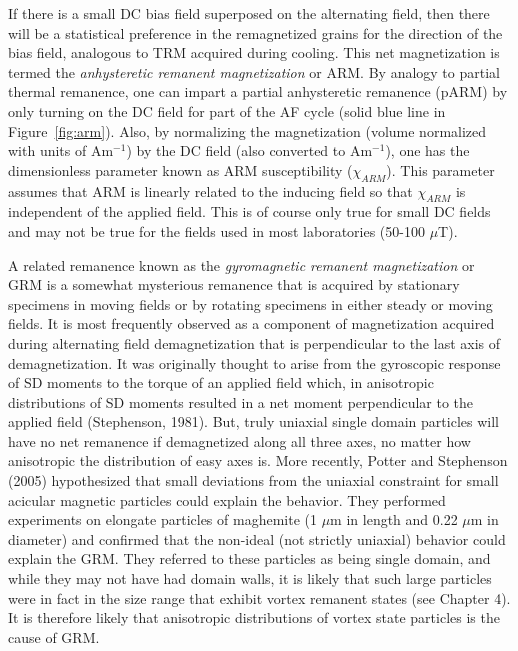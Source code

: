 If there is a small DC bias field superposed on the alternating field, then there will be a statistical
preference in the remagnetized grains for the direction of the bias field,   analogous to
TRM acquired during cooling.  This net magnetization is termed the {\it anhysteretic remanent magnetization} or ARM. 
 By analogy to partial thermal remanence, one can impart a partial anhysteretic remanence (pARM) by only turning on the DC field for part of the AF cycle (solid blue line in Figure~\ref{fig:arm}).    Also, by normalizing the magnetization (volume normalized with units of Am$^{-1}$) by the DC field (also converted to Am$^{-1}$), one has the dimensionless parameter known as ARM susceptibility ($\chi_{ARM}$).   This parameter assumes that ARM is linearly related to the inducing field so that $\chi_{ARM}$ is independent of the applied field.  This is of course only true for small DC fields and may not be true for the fields used in most laboratories (50-100 $\mu$T).    


A related remanence known as the
 {\it gyromagnetic remanent magnetization} or  GRM is a somewhat mysterious remanence that is acquired by stationary specimens in moving fields or by rotating specimens in either steady or moving fields.    It is most frequently observed as a component of magnetization acquired during alternating field demagnetization that is perpendicular to the last axis of demagnetization.   
  It was originally thought to arise from the gyroscopic response of SD moments to the torque of an applied field which, in anisotropic distributions of SD moments resulted in a net moment perpendicular to the applied field
 (Stephenson, 1981). \nocite{stephenson81}  But, truly uniaxial single domain particles will have no net remanence if demagnetized along all three axes, no matter how anisotropic the distribution of easy axes is.  More recently, 
 Potter and Stephenson (2005) \nocite{potter05} hypothesized that small deviations from the uniaxial constraint for small acicular magnetic particles could explain the behavior.  They  performed experiments on elongate particles of maghemite (1 $\mu$m in length and 0.22 $\mu$m in diameter) and confirmed that the  non-ideal (not strictly uniaxial) behavior could explain the GRM.   They referred to these particles as being single domain, and while they may not have had domain walls, it is likely that such large particles were in fact in the size range that exhibit vortex remanent states (see Chapter 4).  It is therefore likely that anisotropic distributions of  vortex state particles is the cause of GRM.  

